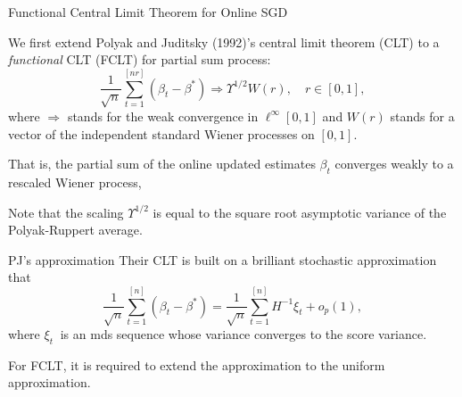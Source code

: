\documentclass[beamer, t]{beamer}
\begin{document}
\begin{frame}{ Functional Central Limit Theorem for Online SGD}

We first  extend
Polyak and Juditsky (1992)'s central limit theorem (CLT) to a \emph{functional} CLT (FCLT) for partial sum process:
\begin{equation*}\label{eq4}
\frac{1}{\sqrt{n}}\sum_{t=1}^{\left[nr\right]}\left(\beta_{t}-\beta^{*}\right)\Rightarrow \Upsilon^{1/2}W\left(r\right),\quad r\in\left[0,1\right],
\end{equation*}
where $\Rightarrow$ stands for the weak convergence in $\ell^{\infty}\left[0,1\right]$
and $W\left(r\right)$ stands for a vector of the independent standard
Wiener processes on $\left[0,1\right]$.

\bigskip
That is, the partial sum of the online updated estimates $\beta_t$ converges weakly to a rescaled Wiener process,

\bigskip 
Note that the scaling $\Upsilon^{1/2}$ is equal to the square root  asymptotic variance of the Polyak-Ruppert average.

\end{frame}

\begin{frame}{PJ's approximation}
	Their CLT is built on a brilliant stochastic approximation that 
	\[  \frac{1}{\sqrt{n}}\sum_{t=1}^{\left[n\right]}\left(\beta_{t}-\beta^{*}\right) = \frac{1}{\sqrt{n}}\sum_{t=1}^{\left[n\right]}H^{-1}\xi_{t} + o_p (1),
	 \]
	 where $ \xi_{t}\ $ is an mds sequence whose variance converges to the score variance. 
	 
	 For FCLT, it is required to extend the approximation to the uniform approximation. 
\end{frame}
\end{document}
